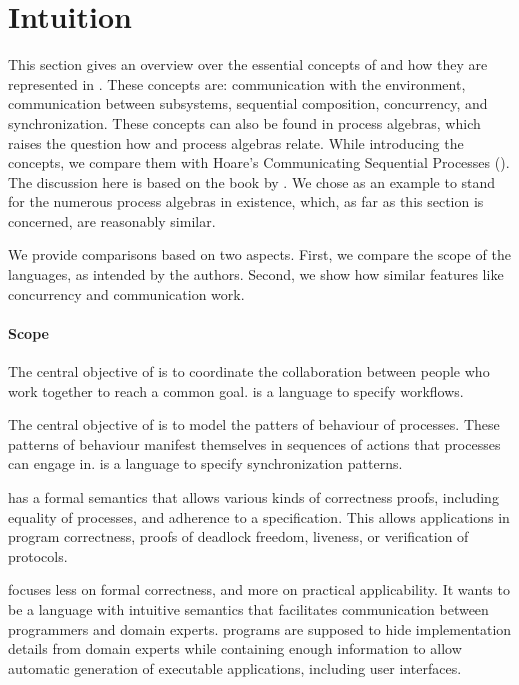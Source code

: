 
\section{Intuition}

This section gives an overview over the essential concepts of \TOP and how they are represented in \TOPHAT.
These concepts are: communication with the environment, communication between subsystems, sequential composition, concurrency, and synchronization.
These concepts can also be found in process algebras, which raises the question how \TOP and process algebras relate.
While introducing the concepts, we compare them with Hoare's Communicating Sequential Processes (\CSP).
The discussion here is based on the book by \citet{books/Hoare85CSP}.
We chose \CSP as an example to stand for the numerous process algebras in existence, which, as far as this section is concerned, are reasonably similar.

We provide comparisons based on two aspects.
First, we compare the scope of the languages, as intended by the authors.
Second, we show how similar features like concurrency and communication work.


\paragraph{Scope}

The central objective of \TOP is to coordinate the collaboration between people who work together to reach a common goal.
\TOP is a language to specify workflows.

The central objective of \CSP is to model the patters of behaviour of processes.
These patterns of behaviour manifest themselves in sequences of actions that processes can engage in.
\CSP is a language to specify synchronization patterns.

\CSP has a formal semantics that allows various kinds of correctness proofs, including equality of processes, and adherence to a specification.
This allows applications in program correctness, proofs of deadlock freedom, liveness, or verification of protocols.

\TOP focuses less on formal correctness, and more on practical applicability.
It wants to be a language with intuitive semantics that facilitates communication between programmers and domain experts.
\TOP programs are supposed to hide implementation details from domain experts while containing enough information to allow automatic generation of executable applications, including user interfaces.


